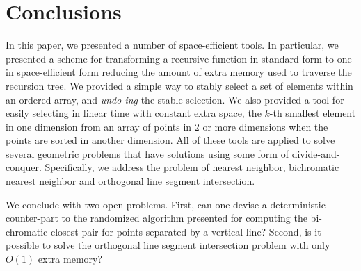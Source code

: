 


\section{Conclusions}\label{sec:conc}
In this paper, we presented a number of space-efficient tools. In
particular, we presented a scheme for transforming a recursive
function in standard form to one in space-efficient form reducing
the amount of extra memory used to traverse the recursion tree.  We
provided a simple way to stably select a set of elements within an
ordered array, and {\em undo-ing} the stable selection.  We also
provided a tool for easily selecting in linear time with constant
extra space, the $k$-th smallest element in one dimension from an
array of points in $2$ or more dimensions when the points are sorted
in another dimension.  All of these tools are applied to solve
several geometric problems that have solutions using some form of
divide-and-conquer. Specifically, we address the problem of nearest
neighbor, bichromatic nearest neighbor and orthogonal line segment
intersection.

We conclude with two open problems. First, can one
devise a deterministic counter-part to the randomized algorithm presented
for computing the bi-chromatic closest pair for points separated by a vertical line?
Second, is it possible to solve the orthogonal line segment intersection problem
with only $O(1)$ extra memory?

